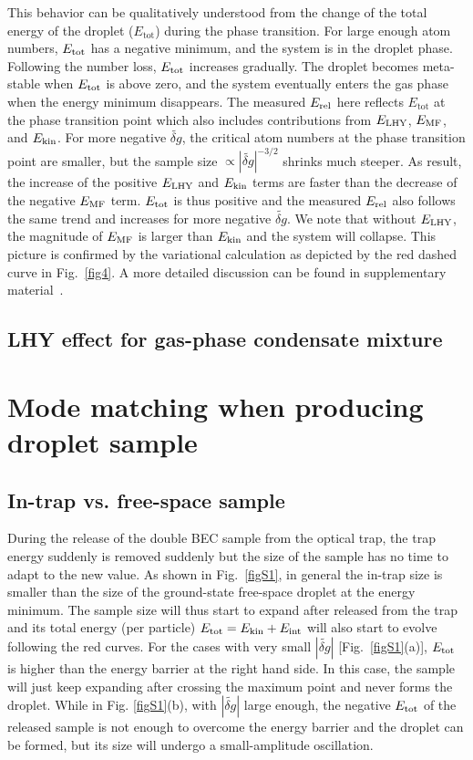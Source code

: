 This behavior can be qualitatively understood from the change of the total energy of the droplet ($E_\text{tot}$) during the phase transition. For large enough atom numbers, $E_{\rm tot}$ has a negative minimum, and the system is in the droplet phase. 
Following the number loss, $E_{\rm tot}$ increases gradually. The droplet becomes meta-stable when $E_{\rm tot}$ is above zero, and the system eventually enters the gas phase when the energy minimum disappears. The measured $E_{\rm rel}$ here reflects $E_\text{tot}$ at the phase transition point which also includes contributions from $E_{\rm LHY}$, $E_{\rm MF}$, and $E_{\rm kin}$.
%
For more negative $\widetilde{\delta g}$, the critical atom numbers at the phase transition point are smaller, but the sample size $\propto |\widetilde{\delta g}|^{-3/2}$ shrinks much steeper. As result, the increase of the positive $E_{\rm LHY}$ and $E_{\rm kin}$ terms are faster than the decrease of the negative $E_{\rm MF}$ term. $E_{\rm tot}$ is thus positive and the measured $E_{\rm rel}$ also follows the same trend and increases for more negative $\widetilde{\delta g}$. We note that without $E_{\rm LHY}$, the magnitude of $E_{\rm MF}$ is larger than $E_{\rm kin}$ and the system will collapse. This picture is confirmed by the variational calculation as depicted by the red dashed curve in Fig.~\ref{fig4}. A more detailed discussion can be found in supplementary material~\cite{SM}.   

\subsection{LHY effect for gas-phase condensate mixture}

\section{Mode matching when producing droplet sample}
\label{sec:mode_match}

\subsection{In-trap vs. free-space sample}

During the release of the double BEC sample from the optical trap, the trap energy suddenly is removed suddenly but the size of the sample has no time to adapt to the new value. As shown in Fig.~\ref{figS1}, in general the in-trap size is smaller than the size of the ground-state free-space droplet at the energy minimum. The sample size will thus start to expand after released from the trap and its total energy (per particle) $E_{\rm tot} = E_{\rm kin} + E_{\rm int}$ will also start to evolve following the red curves. For the cases with very small $|\widetilde{\delta g}|$ [Fig.~\ref{figS1}(a)], $E_{\rm tot}$ is higher than the energy barrier at the right hand side. In this case, the sample will just keep expanding after crossing the maximum point and never forms the droplet.
While in Fig. \ref{figS1}(b), with $|\widetilde{\delta g}|$ large enough, 
the negative $E_{\rm tot}$ of the released sample is not enough to overcome the energy barrier and the droplet can be formed, but its size will undergo a small-amplitude oscillation.





